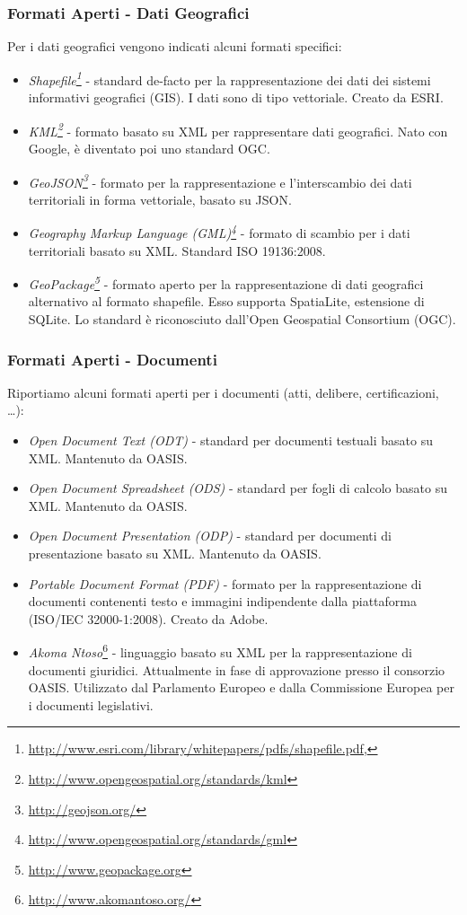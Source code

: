 \documentclass[8pt]{beamer}
\begin{document}
\begin{frame}
\frametitle{Formati Aperti - Dati Geografici}
Per i dati geografici vengono indicati alcuni formati specifici:
\vspace{\baselineskip}
\begin{itemize}[<+->]
    \item \emph{Shapefile\footnote{\url{http://www.esri.com/library/whitepapers/pdfs/shapefile.pdf,}}} - standard de-facto per la rappresentazione dei dati dei sistemi informativi
    geografici (GIS). I dati sono di tipo vettoriale. Creato da ESRI.
    \item \emph{KML\footnote{\url{ http://www.opengeospatial.org/standards/kml}}} - formato basato su XML per rappresentare dati geografici. Nato con Google, \`e
    diventato poi uno standard OGC.
    \item \emph{GeoJSON\footnote{\url{http://geojson.org/}}} - formato per la rappresentazione e l'interscambio dei dati territoriali in
    forma vettoriale, basato su JSON.
    \item \emph{Geography Markup Language (GML)\footnote{\url{http://www.opengeospatial.org/standards/gml}}} - formato di scambio per i dati territoriali basato su XML. 
    Standard ISO 19136:2008.
    \item \emph{GeoPackage\footnote{\url{http://www.geopackage.org}}} - formato aperto per la rappresentazione di dati geografici alternativo al formato 
    shapefile. Esso supporta SpatiaLite, estensione di SQLite. Lo standard \`e riconosciuto dall'Open
    Geospatial Consortium (OGC).
\end{itemize}
\end{frame}

\begin{frame}
\frametitle{Formati Aperti - Documenti}
Riportiamo alcuni formati aperti per i documenti (atti, delibere, certificazioni, \ldots):
\vspace{\baselineskip}

\begin{itemize}[<+->]
  \item \emph{Open Document Text (ODT)} - standard per documenti testuali basato su XML. Mantenuto da OASIS.
  \item \emph{Open Document Spreadsheet (ODS)} - standard per fogli di calcolo basato su XML. Mantenuto da OASIS.
  \item \emph{Open Document Presentation (ODP)} - standard per documenti di presentazione basato su XML. Mantenuto da OASIS.
  \item \emph{Portable Document Format (PDF)} - formato per la rappresentazione di documenti contenenti testo e immagini 
    indipendente dalla piattaforma (ISO/IEC 32000-1:2008). Creato da Adobe.
  \item \emph{Akoma Ntoso}\footnote{\url{http://www.akomantoso.org/}} - linguaggio basato su XML per la rappresentazione di documenti giuridici.
    Attualmente in fase di approvazione presso il consorzio OASIS. Utilizzato dal Parlamento
    Europeo e dalla Commissione Europea per i documenti legislativi.
\end{itemize}
\end{frame}
\end{document}
